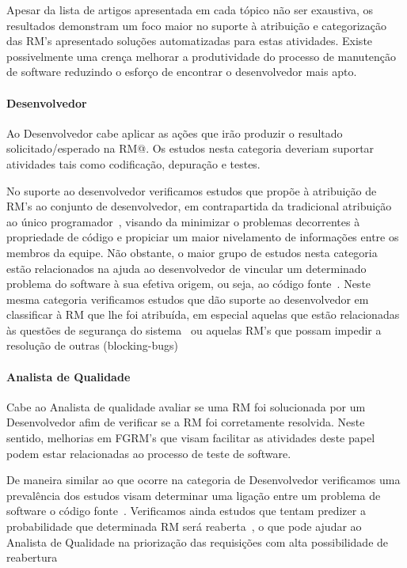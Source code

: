 Apesar da lista de artigos apresentada em cada tópico não ser exaustiva, os
resultados demonstram um foco maior no suporte à atribuição e categorização das
RM's apresentado soluções automatizadas para estas atividades. Existe
possivelmente uma crença melhorar a produtividade do processo de manutenção de
software reduzindo o esforço de encontrar o desenvolvedor mais apto.

\paragraph{Desenvolvedor} Ao Desenvolvedor cabe aplicar as ações que irão
produzir o resultado solicitado/esperado na RM@. Os estudos nesta categoria
deveriam suportar atividades tais como codificação, depuração e testes. 

No suporte ao desenvolvedor verificamos estudos que propõe à atribuição de RM's
ao conjunto de desenvolvedor, em contrapartida da tradicional atribuição ao
único programador~\cite{banitaan2013decoba}, visando da minimizar o problemas
decorrentes à propriedade de código e propiciar um maior nivelamento de
informações entre os membros da equipe. Não obstante, o maior grupo de estudos
nesta categoria estão relacionados na ajuda ao desenvolvedor de vincular um
determinado problema do software à sua efetiva origem, ou seja, ao código
fonte~\cite{corley2011recovering,Wong:2014:BBF:2705615.2706096,
	Thung:2014:BIT:2635868.2661678,Nguyen:2012:MAR:2393596.2393671,thung2013automatic,
	Romo:2015:TAT:2745802.2745833}. Neste mesma categoria verificamos estudos
que dão suporte ao desenvolvedor em classificar à RM que lhe foi atribuída, em
especial aquelas que estão relacionadas às questões de segurança do
sistema~\cite{gegick2010identifying} ou aquelas RM's que possam impedir a
resolução de outras
(blocking-bugs)~\cite{ValdiviaGarcia:2014:CPB:2597073.2597099}

\paragraph{Analista de Qualidade} Cabe ao Analista de qualidade avaliar se uma
RM foi solucionada por um Desenvolvedor afim de verificar se a RM foi
corretamente resolvida. Neste sentido, melhorias em FGRM's que visam facilitar
as atividades deste papel podem estar relacionadas ao processo de teste de
software.

De maneira similar ao que ocorre na categoria de Desenvolvedor verificamos uma
prevalência dos estudos visam determinar uma ligação entre um problema de
software o código
fonte~\cite{corley2011recovering,Wong:2014:BBF:2705615.2706096,
	Thung:2014:BIT:2635868.2661678,Nguyen:2012:MAR:2393596.2393671,thung2013automatic,
	Romo:2015:TAT:2745802.2745833}. Verificamos ainda estudos que tentam
predizer a probabilidade que determinada RM será
reaberta~\cite{xia2015automatic}, o que pode ajudar ao Analista de Qualidade na
priorização das requisições com alta possibilidade de reabertura

